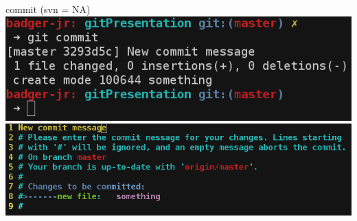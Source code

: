 \begin{frame}
	\begin{block}{commit (svn = NA)}
		\includegraphics[width=\textwidth]{./images/commit.png}
		\newline
		\includegraphics[width=\textwidth]{./images/commitMessage.png}
	\end{block}
\end{frame}
